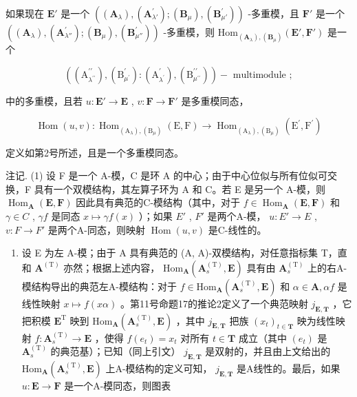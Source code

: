 如果现在 \(\mathbf{E}'\) 是一个 \(((\mathbf{A}_{\lambda}), (\mathbf{A}_{\lambda'}^{\prime}) ; (\mathbf{B}_{\mu}), (\mathbf{B}_{\mu'}^{\prime}))\) -多重模，且 \(\mathbf{F}'\) 是一个 \(((\mathbf{A}_{\lambda}), (\mathbf{A}_{\lambda''}^{\prime}) ; (\mathbf{B}_{\mu}), (\mathbf{B}_{\mu''}^{\prime}))\) -多重模，则 \(\mathrm{Hom}_{(\mathbf{A}_{\lambda}), (\mathbf{B}_{\mu})}(\mathbf{E}', \mathbf{F}')\) 是一个

\[
\left(\left(\mathrm{A} _ {\lambda^ {\prime \prime}} ^ {\prime \prime}\right), \left(\mathrm{B} _ {\mu^ {\prime}} ^ {\prime}\right): \left(\mathrm{A} _ {\lambda^ {\prime}} ^ {\prime}\right), \left(\mathrm{B} _ {\mu^ {\prime \prime}} ^ {\prime \prime}\right)\right) - \text { multimodule };
\]

中的多重模，且若 \(u: \mathbf{E}' \to \mathbf{E}\) , \(v: \mathbf{F} \to \mathbf{F}'\) 是多重模同态，

\[
\operatorname{Hom} (u, v): \operatorname{Hom} _ {\left(\mathrm{A} _ {\lambda}\right), \left(\mathrm{B} _ {\mu}\right)} (\mathrm{E}, \mathrm{F}) \rightarrow \operatorname{Hom} _ {\left(\mathrm{A} _ {\lambda}\right), \left(\mathrm{B} _ {\mu}\right)} \left(\mathrm{E} ^ {\prime}, \mathrm{F} ^ {\prime}\right)
\]

定义如第2号所述，且是一个多重模同态。

注记. (1) 设 F 是一个 A-模，C 是环 A 的中心；由于中心位似与所有位似可交换，F 具有一个双模结构，其左算子环为 A 和 C。若 E 是另一个 A-模，则 \(\operatorname{Hom}_{\mathbf{A}}(\mathbf{E}, \mathbf{F})\) 因此具有典范的C-模结构（其中，对于 \(f \in \operatorname{Hom}_{\mathbf{A}}(\mathbf{E}, \mathbf{F})\) 和 \(\gamma \in C\) , \(\gamma f\) 是同态 \(x \mapsto \gamma f(x)\) ）；如果 \(E'\) , \(F'\) 是两个A-模， \(u: E' \to E\) , \(v: F \to F'\) 是两个A-同态，则映射 \(\operatorname{Hom}(u, v)\) 是C-线性的。

\begin{enumerate}
\def\labelenumi{(\arabic{enumi})}
\setcounter{enumi}{1}
\tightlist
\item
  设 E 为左 A-模；由于 A 具有典范的 (A, A)-双模结构，对任意指标集 T，直和 \(\mathbf{A}^{(\mathrm{T})}\) 亦然；根据上述内容， \(\mathrm{Hom}_{\mathbf{A}}(\mathbf{A}_{s}^{\mathrm{(T)}},\mathbf{E})\) 具有由 \(\mathbf{A}_{s}^{\mathrm{(T)}}\) 上的右A-模结构导出的典范左A-模结构：对于 \(f\in\mathrm{Hom}_{\mathbf{A}}(\mathbf{A}_{s}^{\mathrm{(T)}},\mathbf{E})\) 和 \(\alpha\in\mathbf{A},\alpha f\) 是线性映射 \(x\mapsto f(x\alpha)\) 。第11号命题17的推论2定义了一个典范映射 \(j_{\mathbf{E},\mathbf{T}}\) ，它把积模 \(\mathbf{E}^{\mathrm{T}}\) 映到 \(\mathrm{Hom}_{\mathbf{A}}(\mathbf{A}_{s}^{\mathrm{(T)}},\mathbf{E})\) ，其中 \(j_{\mathbf{E},\mathbf{T}}\) 把族 \((x_{t})_{t\in\mathbf{T}}\) 映为线性映射 \(f:\mathbf{A}_{s}^{\mathrm{(T)}}\to\mathbf{E}\) ，使得 \(f(e_{t})=x_{t}\) 对所有 \(t\in\mathbf{T}\) 成立（其中 \((e_{t})\) 是 \(\mathbf{A}_{s}^{\mathrm{(T)}}\) 的典范基）；已知（同上引文） \(j_{\mathbf{E},\mathbf{T}}\) 是双射的，并且由上文给出的 \(\mathrm{Hom}_{\mathbf{A}}(\mathbf{A}_{s}^{\mathrm{(T)}},\mathbf{E})\) 上A-模结构的定义可知， \(j_{\mathbf{E},\mathbf{T}}\) 是A线性的。最后，如果 \(u:\mathbf{E}\to\mathbf{F}\) 是一个A-模同态，则图表
\end{enumerate}

